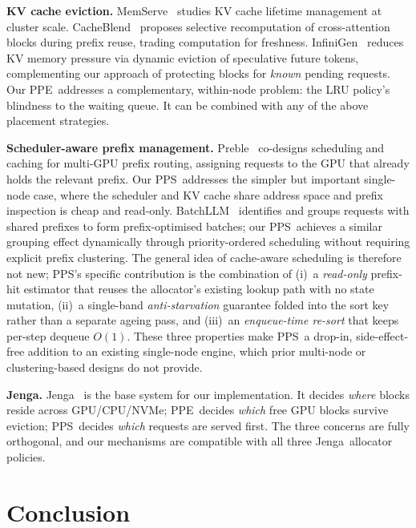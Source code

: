\documentclass[journal]{IEEEtran}
\newcommand{\ppe}{\textsc{PPE}}
\newcommand{\pps}{\textsc{PPS}}
\newcommand{\jenga}{Jenga}
\begin{document}
\textbf{KV cache eviction.}
MemServe~\cite{hu2024memserve} studies KV cache lifetime management at cluster
scale.  CacheBlend~\cite{yao2024cacheblend} proposes selective recomputation
of cross-attention blocks during prefix reuse, trading computation for
freshness.  InfiniGen~\cite{gim2024infinigen} reduces KV memory pressure via
dynamic eviction of speculative future tokens, complementing our approach of
protecting blocks for \emph{known} pending requests.
Our \ppe\ addresses a complementary, within-node problem: the LRU policy's
blindness to the waiting queue.  It can be combined with any of the above
placement strategies.

\textbf{Scheduler-aware prefix management.}
Preble~\cite{shi2024preble} co-designs scheduling and caching for multi-GPU
prefix routing, assigning requests to the GPU that already holds the relevant
prefix.  Our \pps\ addresses the simpler but important single-node case, where
the scheduler and KV cache share address space and prefix inspection is cheap
and read-only.
BatchLLM~\cite{zheng2024batchllm} identifies and groups requests with shared
prefixes to form prefix-optimised batches; our \pps\ achieves a similar
grouping effect dynamically through priority-ordered scheduling without
requiring explicit prefix clustering.
The general idea of cache-aware scheduling is therefore not new; \pps's
specific contribution is the combination of (i)~a \emph{read-only} prefix-hit
estimator that reuses the allocator's existing lookup path with no state
mutation, (ii)~a single-band \emph{anti-starvation} guarantee folded into the
sort key rather than a separate ageing pass, and (iii)~an \emph{enqueue-time
 re-sort} that keeps per-step dequeue $O(1)$.  These three properties make
\pps\ a drop-in, side-effect-free addition to an existing single-node engine,
which prior multi-node or clustering-based designs do not provide.

\textbf{Jenga.}
\jenga~\cite{jenga2025} is the base system for our implementation.  It decides
\emph{where} blocks reside across GPU/CPU/NVMe; \ppe\ decides \emph{which}
free GPU blocks survive eviction; \pps\ decides \emph{which} requests are
served first.  The three concerns are fully orthogonal, and our mechanisms are
compatible with all three \jenga\ allocator policies.

\section{Conclusion}
\label{sec:conc}
\end{document}
